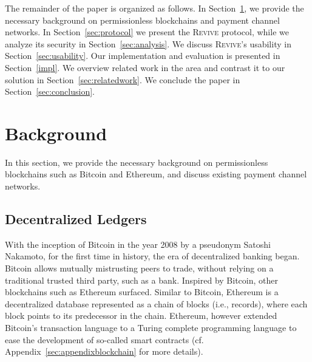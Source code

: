 \documentclass[sigconf]{acmart}
\newcommand{\name}{\textsc{Revive}\xspace}
\begin{document}
The remainder of the paper is organized as follows. In Section~\ref{sec:background}, we provide the necessary background on permissionless blockchains and payment channel networks. In Section~\ref{sec:protocol} we present the \name{} protocol, while we analyze its security in Section~\ref{sec:analysis}. We discuss \name's usability in Section~\ref{sec:usability}. Our implementation and evaluation is presented in Section~\ref{impl}. We overview related work in the area and contrast it to our solution in Section~\ref{sec:relatedwork}. We conclude the paper in Section~\ref{sec:conclusion}.


\section{Background}\label{sec:background}
In this section, we provide the necessary background on permissionless blockchains such as Bitcoin and Ethereum, and discuss existing payment channel networks.

\subsection{Decentralized Ledgers}
With the inception of Bitcoin \cite{nakamoto2008bitcoin} in the year 2008 by a pseudonym Satoshi Nakamoto, for the first time in history, the era of decentralized banking began. Bitcoin allows mutually mistrusting peers to trade, without relying on a traditional trusted third party, such as a bank. Inspired by Bitcoin, other blockchains such as Ethereum surfaced. Similar to Bitcoin, Ethereum is a decentralized database represented as a chain of blocks (i.e., records), where each block points to its predecessor in the chain. Ethereum, however extended Bitcoin's transaction language to a Turing complete programming language to ease the development of so-called smart contracts (cf. Appendix~\ref{sec:appendixblockchain} for more details).
\end{document}
